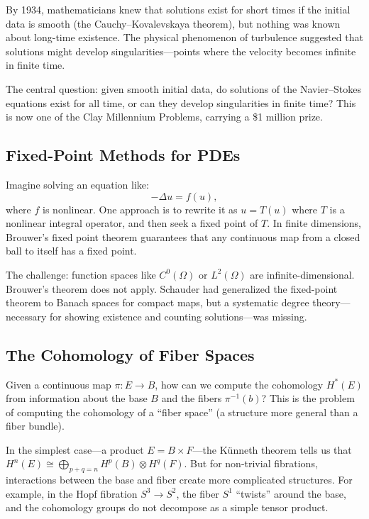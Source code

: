 By 1934, mathematicians knew that solutions exist for short times if the initial data is smooth (the Cauchy--Kovalevskaya theorem), but nothing was known about long-time existence. The physical phenomenon of turbulence suggested that solutions might develop singularities---points where the velocity becomes infinite in finite time.

The central question: given smooth initial data, do solutions of the Navier--Stokes equations exist for all time, or can they develop singularities in finite time? This is now one of the Clay Millennium Problems, carrying a \$1 million prize.

\subsection{Fixed-Point Methods for PDEs}

Imagine solving an equation like:
\[
-\Delta u = f(u),
\]
where $f$ is nonlinear. One approach is to rewrite it as $u = T(u)$ where $T$ is a nonlinear integral operator, and then seek a fixed point of $T$. In finite dimensions, Brouwer's fixed point theorem guarantees that any continuous map from a closed ball to itself has a fixed point.

The challenge: function spaces like $C^0(\Omega)$ or $L^2(\Omega)$ are infinite-dimensional. Brouwer's theorem does not apply. Schauder had generalized the fixed-point theorem to Banach spaces for compact maps, but a systematic degree theory---necessary for showing existence and counting solutions---was missing.

\subsection{The Cohomology of Fiber Spaces}

Given a continuous map $\pi: E \to B$, how can we compute the cohomology $H^*(E)$ from information about the base $B$ and the fibers $\pi^{-1}(b)$? This is the problem of computing the cohomology of a ``fiber space'' (a structure more general than a fiber bundle).

In the simplest case---a product $E = B \times F$---the K{\"u}nneth theorem tells us that $H^n(E) \cong \bigoplus_{p+q=n} H^p(B) \otimes H^q(F)$. But for non-trivial fibrations, interactions between the base and fiber create more complicated structures. For example, in the Hopf fibration $S^3 \to S^2$, the fiber $S^1$ ``twists'' around the base, and the cohomology groups do not decompose as a simple tensor product.

